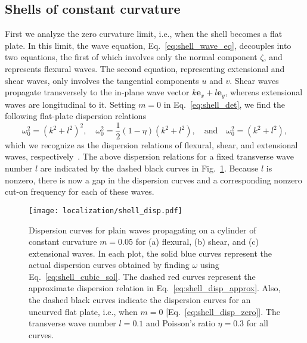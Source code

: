 \subsection{Shells of constant curvature}

First we analyze the zero curvature limit, i.e., when the shell becomes a flat plate.
In this limit, the wave equation, Eq.~\eqref{eq:shell_wave_eq}, decouples into two equations, the first of which involves only the normal component $\zeta$, and represents flexural waves.
The second equation, representing extensional and shear waves, only involves the tangential components $u$ and $v$.
Shear waves propagate transversely to the in-plane wave vector $k\bm{e}_{x} + l\bm{e}_{y}$, whereas extensional waves are longitudinal to it.
Setting $m = 0$ in Eq.~\eqref{eq:shell_det}, we find the following flat-plate dispersion relations
%
\begin{equation}
  \omega_{0}^{2} = \left(k^{2} + l^{2}\right)^{2},\quad
  \omega_{0}^{2} = \frac{1}{2}\left(1-\eta\right)\left(k^{2} + l^{2}\right),
  \quad\text{and}\quad
  \omega_{0}^{2} = \left(k^{2} + l^{2}\right),
  \label{eq:shell_disp_zero}
\end{equation}
%
which we recognize as the dispersion relations of flexural, shear, and extensional waves, respectively~\cite{fung1965}.
The above dispersion relations for a fixed transverse wave number $l$ are indicated by the dashed black curves in Fig.~\ref{fig:shell_disp}.
Because $l$ is nonzero, there is now a gap in the dispersion curves and a corresponding nonzero cut-on frequency for each of these waves.
%
\begin{figure}
  \begin{center}
    \texttt{[image: localization/shell\_disp.pdf]}
  \end{center}
  \caption{%
    Dispersion curves for plain waves propagating on a cylinder of constant curvature $m = 0.05$ for (a) flexural, (b) shear, and (c) extensional waves.
    In each plot, the solid blue curves represent the actual dispersion curves obtained by finding $\omega$ using Eq.~\eqref{eq:shell_cubic_sol}.
    The dashed red curves represent the approximate dispersion relation in Eq.~\eqref{eq:shell_disp_approx}.
    Also, the dashed black curves indicate the dispersion curves for an uncurved flat plate, i.e., when $m = 0$ [Eq.~\eqref{eq:shell_disp_zero}].
    The transverse wave number $l = 0.1$ and Poisson's ratio $\eta = 0.3$ for all curves.
  }
  \label{fig:shell_disp}
\end{figure}


